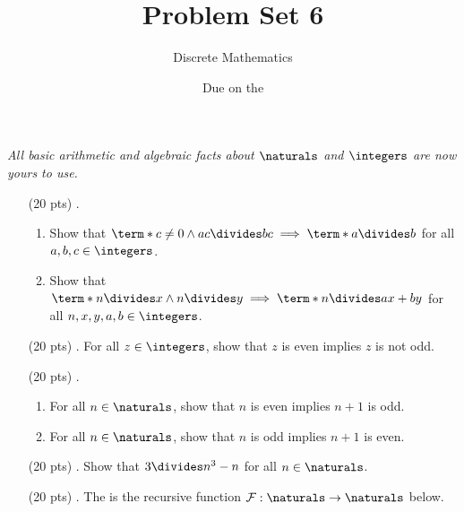 




\title{Problem Set 6}
\author[Daniel Gonzalez Cedre]{Discrete Mathematics}
\date{Due on the }



\maketitle

\emph{All basic arithmetic and algebraic facts about $\naturals$ and $\integers$ are now yours to use.}

\begin{enumerate}
  \item[(20 pts) \quad 1.]
    \begin{enumerate}
      \item
        Show that $\term*{c \neq 0 \land ac \divides bc} \implies \term*{a \divides b}$ for all $a, b, c \in \integers$.
      \item
        Show that $\term*{n \divides x \land n \divides y} \implies \term*{n \divides ax + by}$ for all $n, x, y, a, b \in \integers$.
    \end{enumerate}
  \item[(20 pts) \quad 2.]
    For all $z \in \integers$, show that $z$ is even implies $z$ is not odd.
  \item[(20 pts) \quad 3.]
    \begin{enumerate}
      \item
        For all $n \in \naturals$, show that $n$ is even implies $n + 1$ is odd.
      \item
        For all $n \in \naturals$, show that $n$ is odd implies $n + 1$ is even.
    \end{enumerate}
  \item[(20 pts) \quad 4.]
    Show that $3 \divides n^3 - n$ for all $n \in \naturals$.%
  \item[(20 pts) \quad 5.]
    The  is the recursive function $\mathcal{F}: \naturals \to \naturals$ below.
    \begin{align*}

\end{align*}
\end{enumerate}
